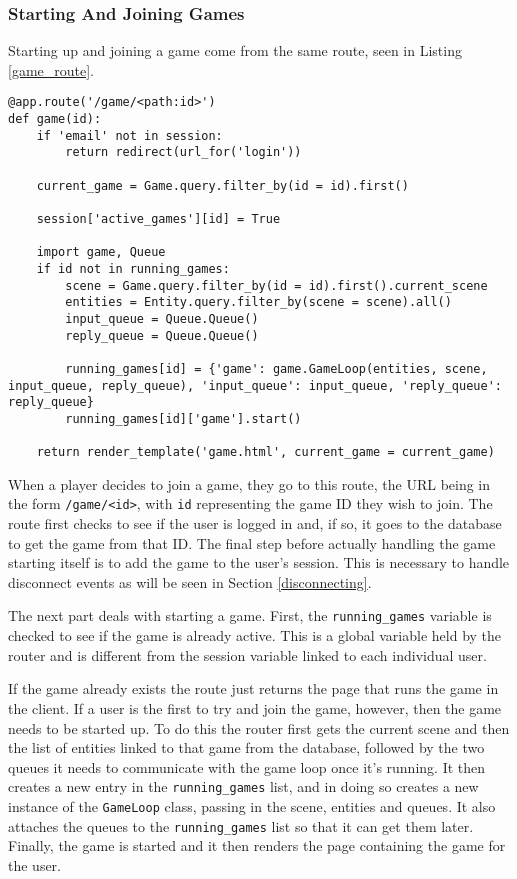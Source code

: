 \subsubsection{Starting And Joining Games}
Starting up and joining a game come from the same route, seen in Listing \ref{game_route}.

\noindent
\begin{minipage}{\linewidth}
\begin{lstlisting}[style=py, caption={The route responsible for starting a game thread.}, label=game_route]
@app.route('/game/<path:id>')
def game(id):
    if 'email' not in session:
        return redirect(url_for('login'))

    current_game = Game.query.filter_by(id = id).first()

    session['active_games'][id] = True

    import game, Queue
    if id not in running_games:
        scene = Game.query.filter_by(id = id).first().current_scene
        entities = Entity.query.filter_by(scene = scene).all()
        input_queue = Queue.Queue()
        reply_queue = Queue.Queue()

        running_games[id] = {'game': game.GameLoop(entities, scene, input_queue, reply_queue), 'input_queue': input_queue, 'reply_queue': reply_queue}
        running_games[id]['game'].start()

    return render_template('game.html', current_game = current_game)
\end{lstlisting}
\end{minipage}

When a player decides to join a game, they go to this route, the URL being in the form \texttt{/game/<id>}, with \texttt{id} representing the game ID they wish to join. The route first checks to see if the user is logged in and, if so, it goes to the database to get the game from that ID. The final step before actually handling the game starting itself is to add the game to the user's session. This is necessary to handle disconnect events as will be seen in Section \ref{disconnecting}.

The next part deals with starting a game. First, the \texttt{running\_games} variable is checked to see if the game is already active. This is a global variable held by the router and is different from the session variable linked to each individual user.

If the game already exists the route just returns the page that runs the game in the client. If a user is the first to try and join the game, however, then the game needs to be started up. To do this the router first gets the current scene and then the list of entities linked to that game from the database, followed by the two queues it needs to communicate with the game loop once it's running. It then creates a new entry in the \texttt{running\_games} list, and in doing so creates a new instance of the \texttt{GameLoop} class, passing in the scene, entities and queues. It also attaches the queues to the \texttt{running\_games} list so that it can get them later. Finally, the game is started and it then renders the page containing the game for the user.

